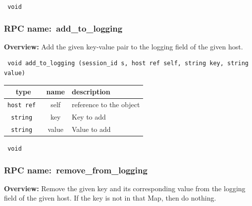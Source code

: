 \vspace{0.3cm}

{\tt 
void
}



\vspace{0.3cm}
\vspace{0.3cm}
\vspace{0.3cm}
\subsubsection{RPC name:~add\_to\_logging}

{\bf Overview:} 
Add the given key-value pair to the logging field of the given host.

\begin{verbatim} void add_to_logging (session_id s, host ref self, string key, string value)\end{verbatim}



 
\vspace{0.3cm}
\begin{tabular}{|c|c|p{7cm}|}
 \hline
{\bf type} & {\bf name} & {\bf description} \\ \hline
{\tt host ref } & self & reference to the object \\ \hline 

{\tt string } & key & Key to add \\ \hline 

{\tt string } & value & Value to add \\ \hline 

\end{tabular}

\vspace{0.3cm}

{\tt 
void
}



\vspace{0.3cm}
\vspace{0.3cm}
\vspace{0.3cm}
\subsubsection{RPC name:~remove\_from\_logging}

{\bf Overview:} 
Remove the given key and its corresponding value from the logging field of
the given host.  If the key is not in that Map, then do nothing.

